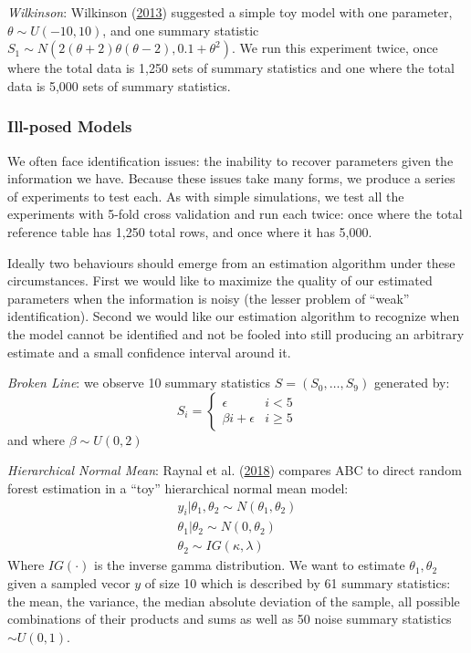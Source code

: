 \documentclass[]{article}
\begin{document}
\emph{Wilkinson}: Wilkinson (\protect\hyperlink{ref-wilkinsonnips}{2013}) suggested a simple toy model with one parameter, \(\theta \sim U(-10,10)\), and one summary statistic \(S_1 \sim N(2 (\theta + 2) \theta(\theta-2), 0.1 + \theta^2)\).
We run this experiment twice, once where the total data is 1,250 sets of summary statistics and one where the total data is 5,000 sets of summary statistics.

\hypertarget{ill-posed-models}{%
\subsubsection{Ill-posed Models}\label{ill-posed-models}}

We often face identification issues: the inability to recover parameters given the information we have.
Because these issues take many forms, we produce a series of experiments to test each.
As with simple simulations, we test all the experiments with 5-fold cross validation and run each twice: once where the total reference table has 1,250 total rows, and once where it has 5,000.

Ideally two behaviours should emerge from an estimation algorithm under these circumstances.
First we would like to maximize the quality of our estimated parameters when the information is noisy (the lesser problem of ``weak'' identification).
Second we would like our estimation algorithm to recognize when the model cannot be identified and not be fooled into still producing an arbitrary estimate and a small confidence interval around it.

\emph{Broken Line}: we observe 10 summary statistics \(S=(S_0,\dots,S_9)\) generated by:
\[
S_i=\left\{\begin{matrix}
\epsilon & i < 5\\ 
\beta i + \epsilon & i\geq5
\end{matrix}\right. \label{eq:brokenline}  
\]
and where \(\beta \sim U(0,2)\)

\emph{Hierarchical Normal Mean}: Raynal et al. (\protect\hyperlink{ref-MarixnArxiv}{2018}) compares ABC to direct random forest estimation in a ``toy'' hierarchical normal mean model:
\[
\left.\begin{matrix}
y_i |\theta_1,\theta_2 \sim N(\theta_1,\theta_2) \\ 
\theta_1|\theta_2 \sim N(0,\theta_2) \\ 
\theta_2 \sim IG(\kappa,\lambda)
\end{matrix}\right. \label{eq:hierarchicalnormalmean}  
\]
Where \(IG(\cdot)\) is the inverse gamma distribution. We want to estimate \(\theta_1,\theta_2\) given a sampled vecor \(y\) of size 10 which is described by 61 summary statistics: the mean, the variance, the median absolute deviation of the sample, all possible combinations of their products and sums as well as 50 noise summary statistics \(\sim U(0,1)\).
\end{document}
